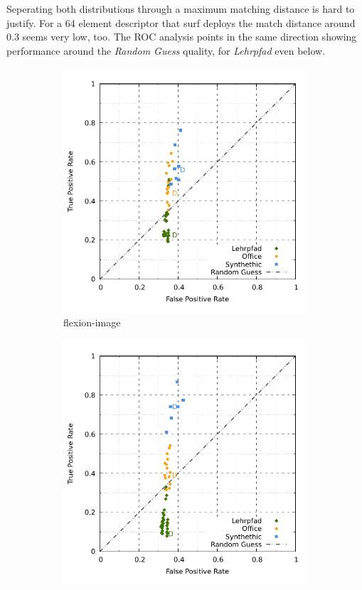 Seperating both distributions through a maximum matching distance is hard to justify.
For a 64 element descriptor that \acrshort{surf} deploys the match distance around \num{0.3} seems very low, too.
The ROC analysis points in the same direction showing performance around the \emph{Random Guess} quality, for \emph{Lehrpfad} even below.
\begin{figure}[H]
\begin{subfigure}[t]{0.45\linewidth}
    \includegraphics[width=\linewidth]{chapter06/results/SURF/flexion/roc.pdf}%
    \caption{\gls{flexion-image}}
\end{subfigure}\quad
\begin{subfigure}[t]{0.45\linewidth}
    \includegraphics[width=\linewidth]{chapter06/results/SURF/bearing/roc.pdf}

\end{subfigure}
\end{figure}
